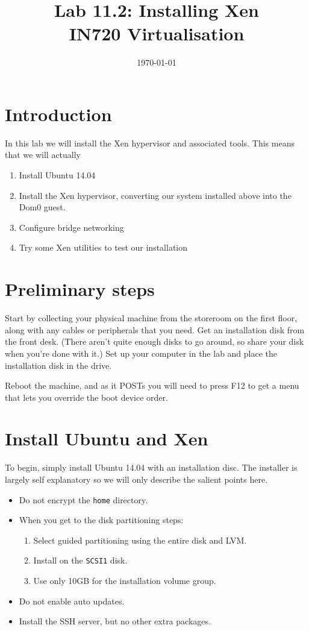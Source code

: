 \documentclass{article}
\begin{document}
\title{Lab 11.2: Installing Xen \\ IN720 Virtualisation}
\date{\today}
\maketitle

\section*{Introduction}
In this lab we will install the Xen hypervisor and associated tools. This means that we will actually

\begin{enumerate}
  \item Install Ubuntu 14.04 
  \item Install the Xen hypervisor, converting our system installed above into the Dom0 guest.
  \item Configure bridge networking 
  \item Try some Xen utilities to test our installation
\end{enumerate}

\section{Preliminary steps}
Start by collecting your physical machine from the storeroom on the first floor, along with any cables or peripherals that you need. Get an installation disk from the front desk. (There aren't quite enough disks to go around, so share your disk when you're done with it.) Set up your computer in the lab and place the installation disk in the drive.

Reboot the machine, and as it POSTs you will need to press F12 to get a menu that lets you override the boot device order.

\section{Install Ubuntu and Xen}
To begin, simply install Ubuntu 14.04 with an installation disc. The installer is largely self explanatory so we will only describe the salient points here.

\begin{itemize}
  \item Do not encrypt the \texttt{home} directory.
  \item When you get to the disk partitioning steps:
           \begin{enumerate}
             \item Select guided partitioning using the entire disk and LVM.
             \item Install on the \texttt{SCSI1} disk.
             \item Use only 10GB for the installation volume group.
           \end{enumerate}
   \item Do not enable auto updates.
   \item Install the SSH server, but no other extra packages.
 \end{itemize}
 
\end{document}
